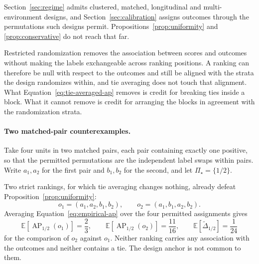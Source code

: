 \documentclass[11pt]{article}
\newcommand{\AP}{\operatorname{AP}}
\newcommand{\PSet}{\Pi_\star}
\newcommand{\E}{\mathbb{E}}
\newcommand{\Dta}{\widetilde{\Delta}}
\theoremstyle{remark}
\begin{document}
Section~\ref{sec:regime} admits clustered, matched, longitudinal and multi-environment designs, and Section~\ref{sec:calibration} assigns outcomes through the permutations such designs permit. Propositions~\ref{prop:uniformity} and \ref{prop:conservative} do not reach that far.

Restricted randomization removes the association between scores and outcomes without making the labels exchangeable across ranking positions. A ranking can therefore be null with respect to the outcomes and still be aligned with the strata the design randomizes within, and tie averaging does not touch that alignment. What Equation~\eqref{eq:tie-averaged-ap} removes is credit for breaking ties inside a block. What it cannot remove is credit for arranging the blocks in agreement with the randomization strata.

\paragraph{Two matched-pair counterexamples.}
Take four units in two matched pairs, each pair containing exactly one positive, so that the permitted permutations are the independent label swaps within pairs. Write $a_1,a_2$ for the first pair and $b_1,b_2$ for the second, and let $\PSet=\{1/2\}$.

Two strict rankings, for which tie averaging changes nothing, already defeat Proposition~\ref{prop:uniformity}:
\[
o_1=(a_1,a_2,b_1,b_2),
\qquad
o_2=(a_1,b_1,a_2,b_2).
\]
Averaging Equation~\eqref{eq:empirical-ap} over the four permitted assignments gives
\[
\E\left[\AP_{1/2}(o_1)\right]=\frac23,
\qquad
\E\left[\AP_{1/2}(o_2)\right]=\frac{11}{16},
\qquad
\E\left[\Dta_{1/2}\right]=\frac{1}{24}
\]
for the comparison of $o_2$ against $o_1$. Neither ranking carries any association with the outcomes and neither contains a tie. The design anchor is not common to them.
\end{document}
